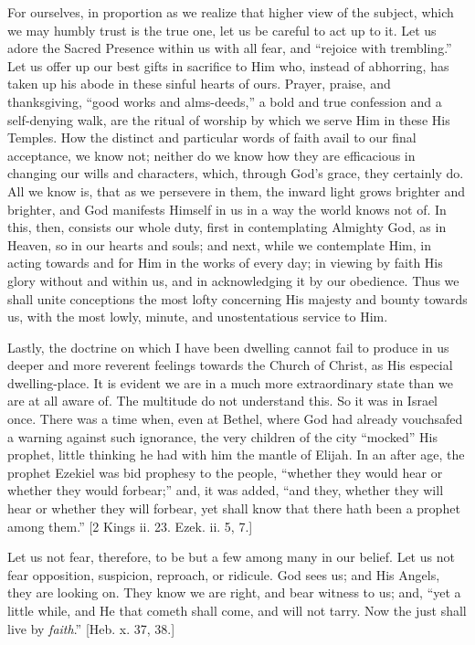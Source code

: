 For ourselves, in proportion as we realize that higher view of the
subject, which we may humbly trust is the true one, let us be careful
to act up to it. Let us adore the Sacred Presence within us with all
fear, and ``rejoice with trembling.'' Let us offer up our best
gifts in sacrifice to Him who, instead of abhorring, has taken up his
abode in these sinful hearts of ours. Prayer, praise, and
thanksgiving, ``good works and alms-deeds,'' a bold and true
confession and a self-denying walk, are the ritual of worship by which
we serve Him in these His Temples. How the distinct and particular
words of faith avail to our final acceptance, we know not; neither do
we know how they are efficacious in changing our wills and characters,
which, through God's grace, they certainly do. All we know is, that
as we persevere in them, the inward light grows brighter and brighter,
and God manifests Himself in us in a way the world knows not of. In
this, then, consists our whole duty, first in contemplating Almighty
God, as in Heaven, so in our hearts and souls; and next, while we
contemplate Him, in acting towards and for Him in the works of every
day; in viewing by faith His glory without and within us, and in
acknowledging it by our obedience. Thus we shall unite conceptions the
most lofty concerning His majesty and bounty towards us, with the most
lowly, minute, and unostentatious service to Him.

Lastly, the doctrine on which I have been dwelling cannot fail to
produce in us deeper and more reverent feelings towards the Church of
Christ, as His especial dwelling-place. It is evident we are in a much
more extraordinary state than we are at all aware of. The multitude do
not understand this. So it was in Israel once. There was a time when,
even at Bethel, where God had already vouchsafed a warning against
such ignorance, the very children of the city ``mocked'' His
prophet, little thinking he had with him the mantle of Elijah. In an
after age, the prophet Ezekiel was bid prophesy to the people,
``whether they would hear or whether they would forbear;''
and, it was added, ``and they, whether they will hear or whether
they will forbear, yet shall know that there hath been a prophet among
them.'' [2 Kings ii. 23. Ezek. ii. 5, 7.]

Let us not fear, therefore, to be but a few among many in our
belief. Let us not fear opposition, suspicion, reproach, or ridicule.
God sees us; and His Angels, they are looking on. They know we are
right, and bear witness to us; and, ``yet a little while, and He
that cometh shall come, and will not tarry. Now the just shall live by
\emph{faith}.'' [Heb. x. 37, 38.]

